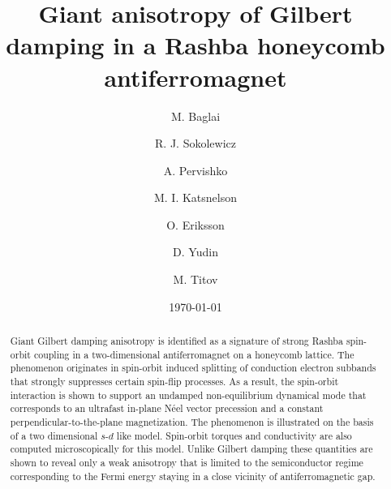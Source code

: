 \documentclass[%
  twocolumn,
  aps,
  prb,
  amsmath,
  amssymb,
  superscriptaddress,
  nofootinbib,
  floatfix
]{revtex4-1}
\newcommand{\0}{^{\phantom{\dagger}}}
\begin{document}
\title{Giant anisotropy of Gilbert damping in a Rashba honeycomb antiferromagnet}

\author{M. Baglai}

\author{R. J. Sokolewicz}

\author{A. Pervishko}

\author{M. I. Katsnelson}

\author{O. Eriksson}

\author{D. Yudin}

\author{M. Titov}


\date{\today}

\begin{abstract}
Giant Gilbert damping anisotropy is identified as a signature of strong Rashba spin-orbit coupling in a two-dimensional antiferromagnet on a honeycomb lattice. The phenomenon originates in spin-orbit induced splitting of conduction electron subbands that strongly suppresses certain spin-flip processes. As a result, the spin-orbit interaction is shown to support an undamped non-equilibrium dynamical mode that corresponds to an ultrafast in-plane N\'eel vector precession and a constant perpendicular-to-the-plane magnetization. The phenomenon is illustrated on the basis of a two dimensional $s$-$d$ like model. Spin-orbit torques and conductivity are also computed microscopically for this model. Unlike Gilbert damping these quantities are shown to reveal only a weak anisotropy that is limited to the semiconductor regime corresponding to the Fermi energy staying in a close vicinity of antiferromagnetic gap.
\end{abstract}
\end{document}
